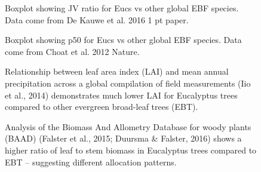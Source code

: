 \documentclass[12pt,a4paper,oneside]{article}
\begin{document}
\FloatBarrier

\begin{figure}[!hbtp]
\centering
{}
\caption{\small{Boxplot showing JV ratio for Eucs vs other global EBF species. Data come from De Kauwe et al. 2016 1 pt paper.}}
\label{}
\end{figure}


\FloatBarrier

\begin{figure}[!hbtp]
\centering
{}
\caption{\small{Boxplot showing p50 for Eucs vs other global EBF species. Data come from Choat et al. 2012 Nature.}}
\label{}
\end{figure}

\FloatBarrier

\begin{figure}[!hbtp]
\centering
{}
\caption{\small{Relationship between leaf area index (LAI) and mean annual precipitation across a global compilation of field measurements (Iio et al., 2014) demonstrates much lower LAI for Eucalyptus trees compared to other evergreen broad-leaf trees (EBT).}}
\label{}
\end{figure}

\FloatBarrier

\begin{figure}[!hbtp]
\centering
{}
\caption{\small{Analysis of the Biomass And Allometry Database for woody plants (BAAD) (Falster et al., 2015; Duursma \& Falster, 2016) shows a higher ratio of leaf to stem biomass in Eucalyptus trees compared to EBT -- suggesting different allocation patterns.}}
\label{}
\end{figure}

\FloatBarrier
\end{document}
